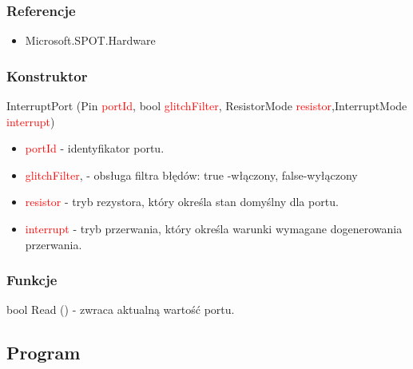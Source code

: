 \documentclass{article}
\begin{document}
\subsubsection{Referencje}
\begin{itemize}
\item Microsoft.SPOT.Hardware
\end{itemize}
\subsubsection{Konstruktor}
 InterruptPort (Pin \textcolor{red}{portId}, bool \textcolor{red}{glitchFilter}, ResistorMode \textcolor{red}{resistor},\newline InterruptMode \textcolor{red}{interrupt})
\begin{itemize}
\item \textcolor{red}{portId} - identyfikator portu.
\item \textcolor{red}{glitchFilter}, - obsługa filtra błędów: true -włączony, false-wyłączony
\item \textcolor{red}{resistor} - tryb rezystora, który określa stan domyślny dla portu.
\item \textcolor{red}{interrupt} - tryb przerwania, który określa warunki wymagane do\newline generowania przerwania.
\end{itemize}
\subsubsection{Funkcje}
bool Read () - zwraca aktualną wartość portu.

\subsection{Program}
\end{document}
